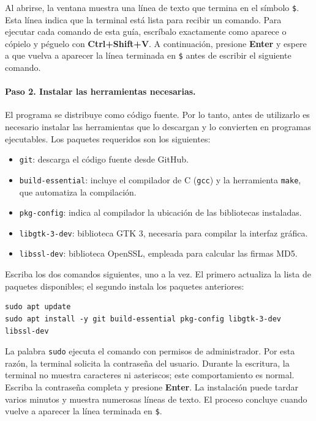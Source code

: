 \documentclass{report}
\begin{document}
Al abrirse, la ventana muestra una línea de texto que termina en el símbolo \texttt{\$}. Esta línea indica que la terminal está lista para recibir un comando. Para ejecutar cada comando de esta guía, escríbalo exactamente como aparece o cópielo y péguelo con \textbf{Ctrl+Shift+V}. A continuación, presione \textbf{Enter} y espere a que vuelva a aparecer la línea terminada en \texttt{\$} antes de escribir el siguiente comando.

\paragraph{Paso 2. Instalar las herramientas necesarias.} El programa se distribuye como código fuente. Por lo tanto, antes de utilizarlo es necesario instalar las herramientas que lo descargan y lo convierten en programas ejecutables. Los paquetes requeridos son los siguientes:

\begin{itemize}
    \item \texttt{git}: descarga el código fuente desde GitHub.
    \item \texttt{build-essential}: incluye el compilador de C (\texttt{gcc}) y la herramienta \texttt{make}, que automatiza la compilación.
    \item \texttt{pkg-config}: indica al compilador la ubicación de las bibliotecas instaladas.
    \item \texttt{libgtk-3-dev}: biblioteca GTK 3, necesaria para compilar la interfaz gráfica.
    \item \texttt{libssl-dev}: biblioteca OpenSSL, empleada para calcular las firmas MD5.
\end{itemize}

Escriba los dos comandos siguientes, uno a la vez. El primero actualiza la lista de paquetes disponibles; el segundo instala los paquetes anteriores:

\begin{lstlisting}[style=terminal]
sudo apt update
sudo apt install -y git build-essential pkg-config libgtk-3-dev libssl-dev
\end{lstlisting}

La palabra \texttt{sudo} ejecuta el comando con permisos de administrador. Por esta razón, la terminal solicita la contraseña del usuario. Durante la escritura, la terminal no muestra caracteres ni asteriscos; este comportamiento es normal. Escriba la contraseña completa y presione \textbf{Enter}. La instalación puede tardar varios minutos y muestra numerosas líneas de texto. El proceso concluye cuando vuelve a aparecer la línea terminada en \texttt{\$}.
\end{document}
